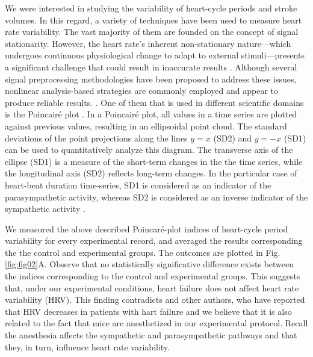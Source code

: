 \documentclass[%
preprint,
 amsmath,amssymb,
 aps,
]{revtex4-2}
\begin{document}
We were interested in studying the variability of heart-cycle periods and stroke volumes. In this regard, a variety of techniques have been used to measure heart rate variability. The vast majority of them are founded on the concept of signal stationarity. However, the heart rate's inherent non-stationary nature---which undergoes continuous physiological change to adapt to external stimuli---presents a significant challenge that could result in inaccurate results \citep{Marwan_2007}. Although several signal preprocessing methodologies have been proposed to address these issues, nonlinear analysis-based strategies are commonly employed and appear to produce reliable results. \citep{Marwan_2002, Aubert_2003, Marwan_2007, Giuliani_1998, Rajendra_Acharya_2006, Webber_1994, Henriques_2020}. One of them that is used in different scientific domains is the Poincairé plot \citep{Hoshi_2016, Webber_1994, Voss_2008}. In a Poincairé plot, all values in a time series are plotted against previous values, resulting in an ellipsoidal point cloud. The standard deviations of the point projections along the lines $y = x$ (SD2) and $y = -x$ (SD1) can be used to quantitatively analyze this diagram. The transverse axis of the ellipse (SD1) is a measure of the short-term changes in the the time series, while the longitudinal axis (SD2) reflects long-term changes. In the particular case of heart-beat duration time-series, SD1 is considered as an indicator of the parasympathetic activity, whereas SD2 is considered as an inverse indicator of the sympathetic activity \citep{Zimatore_2022}.

We measured the above described Poincaré-plot indices of heart-cycle period variability for every experimental record, and averaged the results corresponding the the control and experimental groups. The outcomes are plotted in Fig. \ref{fig:fig02}A. Observe that no statistically significative difference exists between the indices corresponding to the control and experimental groups. This suggests that, under our experimental conditions, heart failure does not affect heart rate variability (HRV). This finding contradicts \citet{Kamen_1995} and other authors, who have reported that HRV decreases in patients with hart failure and we believe that it is also related to the fact that mice are anesthetized in our experimental protocol. Recall the anesthesia affects the sympathetic and parasympathetic pathways and that they, in turn, influence heart rate variability. 
\end{document}
